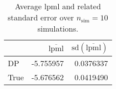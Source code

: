 \begin{table}[H]

\caption{Average lpml and related standard error over $n_{\text{sim}} = 10$ simulations.}
\centering
\begin{tabular}[t]{lrr}
\toprule
  & $\overbar{\text{lpml}}$ & $\text{sd}(\overbar{\text{lpml}})$\\
\midrule
DP & -5.755957 & 0.0376337\\
True & -5.676562 & 0.0419490\\
\bottomrule
\end{tabular}
\end{table}